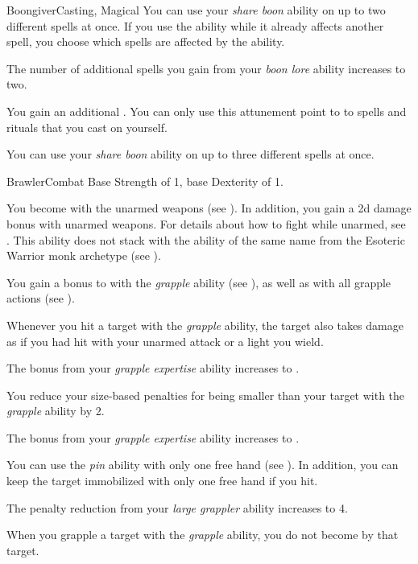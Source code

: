 \begin{feat}{Boongiver}{Casting, Magical}
         You can use your \textit{share boon} ability on up to two different spells at once.
        If you use the ability while it already affects another spell, you choose which spells are affected by the ability.

         The number of additional  spells you gain from your \textit{boon lore} ability increases to two.

         You gain an additional .
        You can only use this attunement point to  to spells and rituals that you cast on yourself.

         You can use your \textit{share boon} ability on up to three different spells at once.
    \end{feat}

    \begin{feat}{Brawler}{Combat}
        \featpre Base Strength of 1, base Dexterity of 1.

         You become  with the unarmed weapons  (see ).
        In addition, you gain a \plus2d damage bonus with unarmed weapons.
        For details about how to fight while unarmed, see .
        This ability does not stack with the ability of the same name from the Esoteric Warrior monk archetype (see ).

         You gain a  bonus to  with the \textit{grapple} ability (see ), as well as with all grapple actions (see ).

         Whenever you hit a target with the \textit{grapple} ability, the target also takes damage as if you had hit with your unarmed attack or a light  you wield.

         The bonus from your \textit{grapple expertise} ability increases to .

         You reduce your size-based penalties for being smaller than your target with the \textit{grapple} ability by 2.

         The bonus from your \textit{grapple expertise} ability increases to .

         You can use the \textit{pin} ability with only one free hand (see ).
        In addition, you can keep the target immobilized with only one free hand if you hit.

         The penalty reduction from your \textit{large grappler} ability increases to 4.

         When you grapple a target with the \textit{grapple} ability, you do not become \grappled by that target.
    \end{feat}

